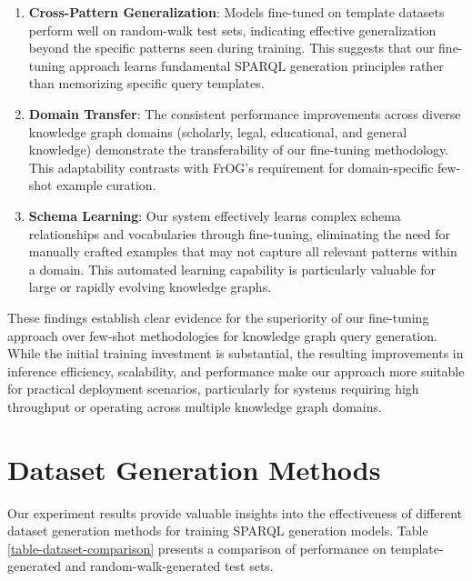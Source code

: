 \begin{enumerate}
    \item \textbf{Cross-Pattern Generalization}: Models fine-tuned on template datasets perform well on random-walk test sets, indicating effective generalization beyond the specific patterns seen during training. This suggests that our fine-tuning approach learns fundamental SPARQL generation principles rather than memorizing specific query templates.
    
    \item \textbf{Domain Transfer}: The consistent performance improvements across diverse knowledge graph domains (scholarly, legal, educational, and general knowledge) demonstrate the transferability of our fine-tuning methodology. This adaptability contrasts with FrOG's requirement for domain-specific few-shot example curation.
    
    \item \textbf{Schema Learning}: Our system effectively learns complex schema relationships and vocabularies through fine-tuning, eliminating the need for manually crafted examples that may not capture all relevant patterns within a domain. This automated learning capability is particularly valuable for large or rapidly evolving knowledge graphs.
\end{enumerate}

These findings establish clear evidence for the superiority of our fine-tuning approach over few-shot methodologies for knowledge graph query generation. While the initial training investment is substantial, the resulting improvements in inference efficiency, scalability, and performance make our approach more suitable for practical deployment scenarios, particularly for systems requiring high throughput or operating across multiple knowledge graph domains.

\section{Dataset Generation Methods}
\label{ga-dataset}

Our experiment results provide valuable insights into the effectiveness of different dataset generation methods for training SPARQL generation models. Table \ref{table-dataset-comparison} presents a comparison of performance on template-generated and random-walk-generated test sets.

